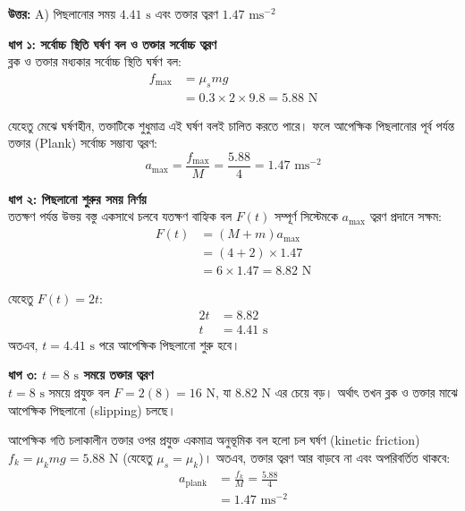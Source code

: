 \documentclass[12pt, a4paper]{article}
\begin{document}
\vspace{0.5em}
\begin{tcolorbox}[answerbox]
    \textbf{\color{success} উত্তর:} A) পিছলানোর সময় $4.41\text{ s}$ এবং তক্তার ত্বরণ $1.47\text{ ms}^{-2}$
\end{tcolorbox}
\vspace{1em}

\begin{tcolorbox}[solutionbox={সমাধান (Solution)}]
    \noindent
    \textbf{ধাপ ১: সর্বোচ্চ স্থিতি ঘর্ষণ বল ও তক্তার সর্বোচ্চ ত্বরণ} \\
    ব্লক ও তক্তার মধ্যকার সর্বোচ্চ স্থিতি ঘর্ষণ বল:
    \begin{align*}
        f_{\max} &= \mu_s m g \\
        &= 0.3 \times 2 \times 9.8 = 5.88\text{ N}
    \end{align*}
    
    যেহেতু মেঝে ঘর্ষণহীন, তক্তাটিকে শুধুমাত্র এই ঘর্ষণ বলই চালিত করতে পারে। ফলে আপেক্ষিক পিছলানোর পূর্ব পর্যন্ত তক্তার (Plank) সর্বোচ্চ সম্ভাব্য ত্বরণ:
    \[ a_{\max} = \frac{f_{\max}}{M} = \frac{5.88}{4} = 1.47\text{ ms}^{-2} \]
    
    \vspace{0.5em}
    \noindent\textbf{ধাপ ২: পিছলানো শুরুর সময় নির্ণয়} \\
    ততক্ষণ পর্যন্ত উভয় বস্তু একসাথে চলবে যতক্ষণ বাহ্যিক বল $F(t)$ সম্পূর্ণ সিস্টেমকে $a_{\max}$ ত্বরণ প্রদানে সক্ষম:
    \begin{align*}
        F(t) &= (M + m) a_{\max} \\
        &= (4 + 2) \times 1.47 \\
        &= 6 \times 1.47 = 8.82\text{ N}
    \end{align*}
    
    যেহেতু $F(t) = 2t$:
    \begin{align*}
        2t &= 8.82 \\
        t &= \mathbf{4.41}\text{ s}
    \end{align*}
    অতএব, $t = 4.41\text{ s}$ পরে আপেক্ষিক পিছলানো শুরু হবে।
    
    \vspace{0.5em}
    \noindent\textbf{ধাপ ৩: $t = 8\text{ s}$ সময়ে তক্তার ত্বরণ} \\
    $t = 8\text{ s}$ সময়ে প্রযুক্ত বল $F = 2(8) = 16\text{ N}$, যা $8.82\text{ N}$ এর চেয়ে বড়। অর্থাৎ তখন ব্লক ও তক্তার মাঝে আপেক্ষিক পিছলানো (slipping) চলছে।
    
    আপেক্ষিক গতি চলাকালীন তক্তার ওপর প্রযুক্ত একমাত্র অনুভূমিক বল হলো চল ঘর্ষণ (kinetic friction) $f_k = \mu_k m g = 5.88\text{ N}$ (যেহেতু $\mu_s = \mu_k$)।
    অতএব, তক্তার ত্বরণ আর বাড়বে না এবং অপরিবর্তিত থাকবে:
    \begin{align*}
        a_{\text{plank}} &= \frac{f_k}{M} = \frac{5.88}{4} \\
        &= \mathbf{1.47}\text{ ms}^{-2}
    \end{align*}
\end{tcolorbox}
\end{document}
